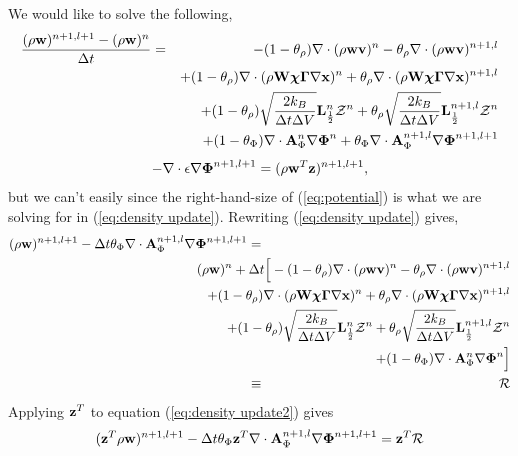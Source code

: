 \documentclass[final]{siamltex}
\def\Ab {{\bf A}}
\def\Lb {{\bf L}}
\def\vb {{\bf v}}
\def\wb {{\bf w}}
\def\Wb {{\bf W}}
\def\xb {{\bf x}}
\def\zb {{\bf z}}
\def\chib   {\boldsymbol{\chi}}
\def\Gammab {\boldsymbol{\Gamma}}
\def\Phib   {\boldsymbol{\Phi}}
\def\half   {\frac{1}{2}}
\begin{document}
We would like to solve the following,
\begin{eqnarray}
\frac{(\rho\wb)^{n+1,l+1} - (\rho\wb)^n}{\Delta t} &=&  -(1-\theta_\rho)\nabla\cdot(\rho\wb\vb)^n - \theta_\rho\nabla\cdot(\rho\wb\vb)^{n+1,l}\nonumber\\
&&+ (1-\theta_\rho)\nabla\cdot(\rho\Wb\chib\Gammab\nabla\xb)^n + \theta_\rho\nabla\cdot(\rho\Wb\chib\Gammab\nabla\xb)^{n+1,l} \nonumber\\
&&+ (1-\theta_\rho)\sqrt{\frac{2k_B}{\Delta t\Delta V}}\Lb_\half^n\mathcal{Z}^n
+ \theta_\rho\sqrt{\frac{2k_B}{\Delta t\Delta V}}\Lb_\half^{n+1,l}\mathcal{Z}^n\nonumber\\
&&+ (1-\theta_\Phi)\nabla\cdot \Ab_\Phi^n\nabla\Phib^n + \theta_\Phi\nabla\cdot \Ab_\Phi^{n+1,l}\nabla\Phib^{n+1,l+1}
\label{eq:density update}
\end{eqnarray}
\begin{equation}
-\nabla\cdot\epsilon\nabla\Phib^{n+1,l+1} = (\rho\wb^T\zb)^{n+1,l+1},\label{eq:potential}
\end{equation}
but we can't easily since the right-hand-size of (\ref{eq:potential}) is what we are
solving for in (\ref{eq:density update}).  Rewriting (\ref{eq:density update}) gives,
\begin{eqnarray}
(\rho\wb)^{n+1,l+1} - \Delta t\theta_\Phi\nabla\cdot \Ab_\Phi^{n+1,l}\nabla\Phib^{n+1,l+1} &=& \nonumber\\
&&\hspace{-1.5in}(\rho\wb)^n + \Delta t\Big[-(1-\theta_\rho)\nabla\cdot(\rho\wb\vb)^n -\theta_\rho\nabla\cdot(\rho\wb\vb)^{n+1,l}\nonumber\\
&&\hspace{-.7in}+ (1-\theta_\rho)\nabla\cdot(\rho\Wb\chib\Gammab\nabla\xb)^n + \theta_\rho\nabla\cdot(\rho\Wb\chib\Gammab\nabla\xb)^{n+1,l}\nonumber\\
&&\hspace{-.7in}+ (1-\theta_\rho)\sqrt{\frac{2k_B}{\Delta t\Delta V}}\Lb_\half^n\mathcal{Z}^n + \theta_\rho\sqrt{\frac{2k_B}{\Delta t\Delta V}}\Lb_\half^{n+1,l}\mathcal{Z}^n\nonumber\\
&&\hspace{-.7in}+ (1-\theta_\Phi)\nabla\cdot \Ab_\Phi^n\nabla\Phib^n\Big]\nonumber\\
&\equiv& \mathcal{R}\label{eq:density update2}
\end{eqnarray}
Applying $\zb^T$ to equation (\ref{eq:density update2}) gives
\begin{equation}
(\zb^T\rho\wb)^{n+1,l+1} - \Delta t\theta_\Phi\zb^T\nabla\cdot \Ab_\Phi^{n+1,l}\nabla\Phib^{n+1,l+1} = \zb^T\mathcal{R}\label{eq:density update3}
\end{equation}
\end{document}
